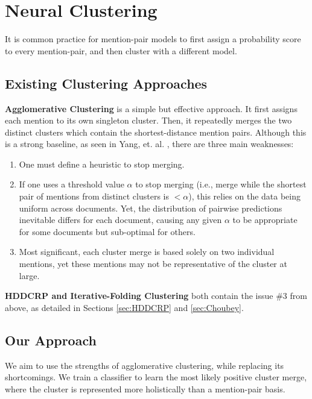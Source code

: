 \documentclass[11pt,a4paper]{article}
\begin{document}

\section{Neural Clustering}
\label{sec:clustering}
It is common practice for mention-pair models to first assign a probability score to every mention-pair, and then cluster with a different model.

\subsection{Existing Clustering Approaches}
\textbf{Agglomerative Clustering} is a simple but effective approach.  It first assigns each mention to its own singleton cluster.  Then, it repeatedly merges the two distinct clusters which contain the shortest-distance mention pairs.  Although this is a strong baseline, as seen in Yang, et. al. , there are three main weaknesses:
\begin{enumerate}
\item One must define a heuristic to stop merging.
\item If one uses a threshold value $\alpha$ to stop merging (i.e., merge while the shortest pair of mentions from distinct clusters is $<\alpha$), this relies on the data being uniform across documents. Yet, the distribution of pairwise predictions inevitable differs for each document, causing any given $\alpha$ to be appropriate for some documents but sub-optimal for others.
\item Most significant, each cluster merge is based solely on two individual mentions, yet these mentions may not be representative of the cluster at large.
\end{enumerate}

\textbf{HDDCRP and Iterative-Folding Clustering} both contain the issue \#3 from above, as detailed in Sections \ref{sec:HDDCRP} and \ref{sec:Choubey}.

\subsection{Our Approach}
We aim to use the strengths of agglomerative clustering, while replacing its shortcomings.  We train a classifier to learn the most likely {positive cluster merge}, where the cluster is represented more holistically than a mention-pair basis.
\end{document}
